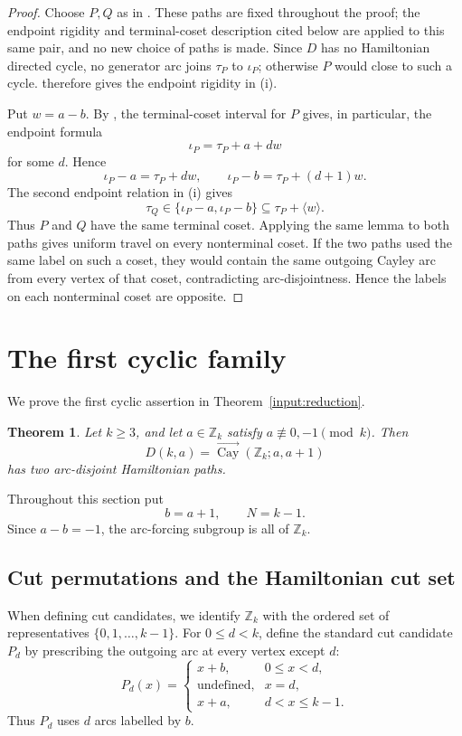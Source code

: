 \documentclass[11pt]{article}
\newtheorem{theorem}{Theorem}[section]
\newcommand{\Cay}{\overrightarrow{\operatorname{Cay}}}
\newcommand{\Z}{\mathbb Z}
\begin{document}
\begin{proof}
Choose $P,Q$ as in \cite[Theorem~4.4]{DMM}.  These paths are fixed throughout the proof; the endpoint rigidity and terminal-coset description cited below are applied to this same pair, and no new choice of paths is made.  Since $D$ has no Hamiltonian directed cycle, no generator arc joins $\tau_P$ to $\iota_P$; otherwise $P$ would close to such a cycle.  \cite[Proposition~4.6]{DMM} therefore gives the endpoint rigidity in (i).

Put $w=a-b$.  By \cite[Lemma~3.9]{DMM}, the terminal-coset interval for $P$ gives, in particular, the endpoint formula
\[
        \iota_P=\tau_P+a+dw
\]
for some $d$.  Hence
\[
        \iota_P-a=\tau_P+dw,
        \qquad
        \iota_P-b=\tau_P+(d+1)w.
\]
The second endpoint relation in (i) gives
\[
        \tau_Q\in\{\iota_P-a,\iota_P-b\}
        \subseteq \tau_P+\langle w\rangle.
\]
Thus $P$ and $Q$ have the same terminal coset.  Applying the same lemma to both paths gives uniform travel on every nonterminal coset.  If the two paths used the same label on such a coset, they would contain the same outgoing Cayley arc from every vertex of that coset, contradicting arc-disjointness.  Hence the labels on each nonterminal coset are opposite.
\end{proof}


\section{The first cyclic family}\label{sec:first-family}

We prove the first cyclic assertion in Theorem~\ref{input:reduction}.

\begin{theorem}\label{thm:first-family}
Let $k\ge3$, and let $a\in\Z_k$ satisfy $a\not\equiv0,-1\pmod{k}$.  Then
\[
        D(k,a)=\Cay(\Z_k;a,a+1)
\]
has two arc-disjoint Hamiltonian paths.
\end{theorem}

Throughout this section put
\[
        b=a+1,
        \qquad
        N=k-1.
\]
Since $a-b=-1$, the arc-forcing subgroup is all of $\Z_k$.

\subsection{Cut permutations and the Hamiltonian cut set}

When defining cut candidates, we identify $\Z_k$ with the ordered set of representatives $\{0,1,\ldots,k-1\}$.  For $0\le d<k$, define the standard cut candidate $P_d$ by prescribing the outgoing arc at every vertex except $d$:
\[
P_d(x)=
\begin{cases}
        x+b, & 0\le x<d,\\
        \text{undefined}, & x=d,\\
        x+a, & d<x\le k-1.
\end{cases}
\]
Thus $P_d$ uses $d$ arcs labelled by $b$.
\end{document}
